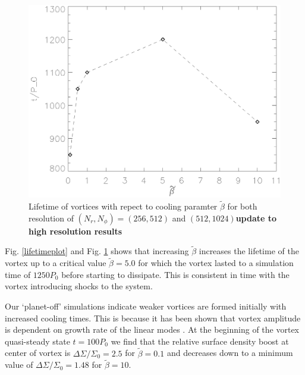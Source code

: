 

\begin{figure}
    \includegraphics[width=\linewidth]{figures/betaplot}
 \caption{Lifetime of vortices with repect to cooling paramter $\tilde\beta$ for both resolution of $(N_r,N_\phi)=(256,512)$ and $(512,1024)${\bf update to high resolution results} } \label{betaplot}
\end{figure}

Fig. \ref{lifetimeplot} and Fig. \ref{betaplot} shows that increasing 
$\tilde{\beta}$
increases the lifetime of the vortex up to a critical 
value $\tilde{\beta}=5.0$ for which the vortex lasted to a simulation time of
 $1250P_0$ before starting to dissipate. This is consistent in time with the
 vortex introducing shocks to the system.

Our `planet-off' simulations
indicate weaker vortices are formed initially with increased cooling
times. This is because it has been shown that vortex amplitude is dependent on 
growth rate of the linear modes \citep{meheut2013}.
At the beginning of the vortex quasi-steady state $t=100P_0$ we find
that the relative surface density boost at center of vortex 
is $\Delta\Sigma/\Sigma_0=2.5$ for $\tilde\beta=0.1$ 
and decreases down to a minimum value of $\Delta\Sigma/\Sigma_0=1.48$ for 
$\tilde\beta=10$. 


